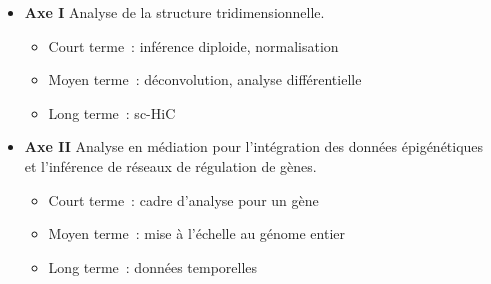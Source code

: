\documentclass[11pt,xcolor=dvipsnames]{beamer}
\begin{document}
\begin{frame}
\begin{overlayarea}{12cm}{5cm}
\small
\begin{columns}
\begin{column}{0.7\linewidth}
\begin{itemize}[leftmargin=*]
\scriptsize
\item<4-> {\bf Axe I} \quad Analyse de la structure tridimensionnelle.
\begin{itemize}
\tiny
\item<4->[-] Court terme~: inférence diploide, normalisation
\item<4->[-] Moyen terme~: déconvolution, analyse
différentielle
\item<4->[-] Long terme~: sc-HiC
\end{itemize}
\item<5-> {\bf Axe II} \quad Analyse en médiation pour l'intégration des
données épigénétiques et l'inférence de réseaux de régulation de gènes.
\begin{itemize}
\tiny
\item<5->[-] Court terme~: cadre d'analyse pour un gène
\item<5->[-] Moyen terme~: mise à l'échelle au génome entier
\item<5->[-] Long terme~: données temporelles
\end{itemize}
\end{itemize}
\end{column}
\begin{column}{0.3\linewidth}
\begin{overlayarea}{0.9\linewidth}{2cm}
\end{overlayarea}
\end{column}
\end{columns}

\end{overlayarea}
\end{frame}
\end{document}
